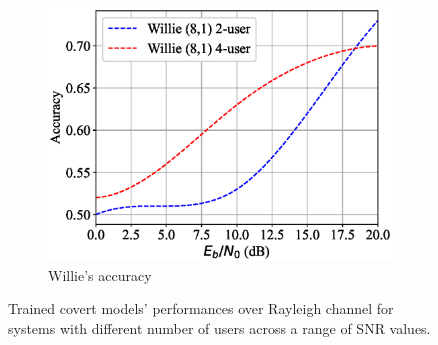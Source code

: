 \begin{figure}[tp!]
\begin{subfigure}{0.28\textwidth}
		\includegraphics[width=\linewidth]{figs/multi_willie_accuracy_rayleigh}
		\caption{Willie's accuracy}
		\label{fig:multi_rayleigh_results_willie}
	\end{subfigure}
	\caption{Trained covert models' performances over Rayleigh channel for systems with different number of users across a range of SNR values.}
	\label{fig:multi_rayleigh_results}
\end{figure}
